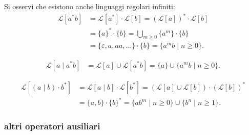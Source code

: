 Si osservi che esistono anche linguaggi regolari infiniti:
\[
\begin{aligned}
    \mathcal{L}[a^*b] &= \mathcal{L}[a^*] \cdot \mathcal{L}[b] = (\mathcal{L}[a])^* \cdot \mathcal{L}[b] \\
    &= \{a\}^* \cdot \{b\} = \bigcup_{m \geq 0} \{a^m\} \cdot \{b\} \\
    &= \{\varepsilon, a, aa, \ldots\} \cdot \{b\} = \{a^m b \mid n \geq 0\}.
\end{aligned}
\]

\[
\begin{aligned}
    \mathcal{L}[a \mid a^*b] &= \mathcal{L}[a] \cup \mathcal{L}[a^*b] = \{a\} \cup \{a^m b \mid n \geq 0\}.
\end{aligned}
\]

\[
\begin{aligned}
    \mathcal{L}[(a \mid b) \cdot b^*] &= \mathcal{L}[a \mid b] \cdot \mathcal{L}[b^*] = (\mathcal{L}[a] \cup \mathcal{L}[b]) \cdot (\mathcal{L}[b])^* \\
    &= \{a, b\} \cdot \{b\}^* = \{a b^m \mid n \geq 0\} \cup \{b^n \mid n \geq 1\}.
\end{aligned}
\]

\subsubsection{altri operatori ausiliari}

